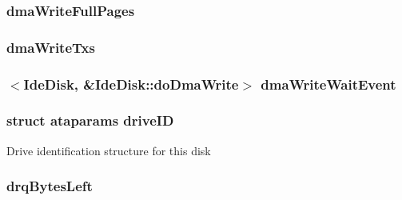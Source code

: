 \label{classIdeDisk_a6c721e441022d80574b109229351326a}
\hypertarget{classIdeDisk_adca0399abe696c769a268759b7823090}{
\subsubsection[{dmaWriteFullPages}]{ {\bf dmaWriteFullPages}}}
\label{classIdeDisk_adca0399abe696c769a268759b7823090}
\hypertarget{classIdeDisk_a2bb232dff5f135210d3350a21d1c9ccf}{
\subsubsection[{dmaWriteTxs}]{ {\bf dmaWriteTxs}}}
\label{classIdeDisk_a2bb232dff5f135210d3350a21d1c9ccf}
\hypertarget{classIdeDisk_ad35ded50a6e608571cb80f1ad9741514}{
\subsubsection[{dmaWriteWaitEvent}]{$<${\bf IdeDisk}, \&IdeDisk::doDmaWrite$>$ {\bf dmaWriteWaitEvent}}}
\label{classIdeDisk_ad35ded50a6e608571cb80f1ad9741514}
\hypertarget{classIdeDisk_ae8a5371b95892db84d2b7ecef320d8a9}{
\subsubsection[{driveID}]{\setlength{\rightskip}{0pt plus 5cm}struct {\bf ataparams} {\bf driveID}}}
\label{classIdeDisk_ae8a5371b95892db84d2b7ecef320d8a9}
Drive identification structure for this disk \hypertarget{classIdeDisk_a93e2e2892d126eac3ce8dbb514d44c31}{
\subsubsection[{drqBytesLeft}]{ {\bf drqBytesLeft}}}
